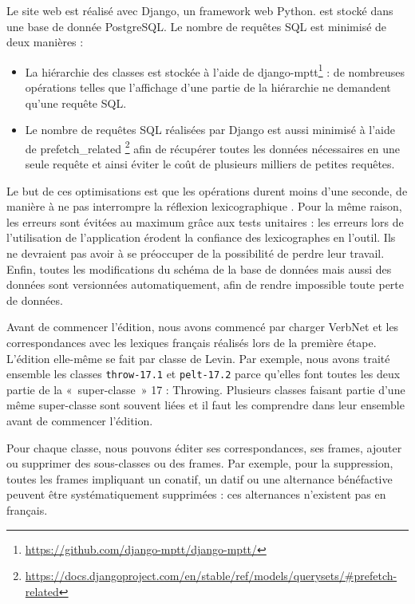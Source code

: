 Le site web est réalisé avec Django, un framework web Python. \verbenet{} est
stocké dans une base de donnée PostgreSQL. Le nombre de requêtes SQL est
minimisé de deux manières :
\begin{itemize}
    \item La hiérarchie des classes est stockée à l'aide de
        django-mptt\footnote{\url{https://github.com/django-mptt/django-mptt/}}
        : de nombreuses opérations telles que l'affichage d'une partie de la
        hiérarchie ne demandent qu'une requête SQL.
    \item Le nombre de requêtes SQL réalisées par Django est aussi minimisé à
        l'aide de prefetch\_related
        \footnote{\url{https://docs.djangoproject.com/en/stable/ref/models/querysets/#prefetch-related}}
        afin de récupérer toutes les données nécessaires en une seule requête
        et ainsi éviter le coût de plusieurs milliers de petites requêtes.
\end{itemize}

Le but de ces optimisations est que les opérations durent moins d'une seconde,
de manière à ne pas interrompre la réflexion lexicographique
\citep{nielsen1994response}. Pour la même raison, les erreurs sont évitées au
maximum grâce aux tests unitaires : les erreurs lors de l'utilisation de
l'application érodent la confiance des lexicographes en l'outil. Ils ne
devraient pas avoir à se préoccuper de la possibilité de perdre leur travail.
Enfin, toutes les modifications du schéma de la base de données mais aussi des
données sont versionnées automatiquement, afin de rendre impossible toute perte
de données.

Avant de commencer l'édition, nous avons commencé par charger VerbNet et les
correspondances avec les lexiques français réalisés lors de la première étape.
L'édition elle-même se fait par classe de Levin. Par exemple, nous avons traité
ensemble les classes {\color{blue}\texttt{throw-17.1}} et
{\color{blue}\texttt{pelt-17.2}} parce qu'elles font toutes les deux partie de
la «~super-classe~» 17 : Throwing.  Plusieurs classes faisant partie d'une même
super-classe sont souvent liées et il faut les comprendre dans leur ensemble
avant de commencer l'édition.

Pour chaque classe, nous pouvons éditer ses correspondances, ses frames,
ajouter ou supprimer des sous-classes ou des frames. Par exemple, pour la
suppression, toutes les frames impliquant un conatif, un datif ou une
alternance bénéfactive peuvent être systématiquement supprimées : ces
alternances n'existent pas en français.

